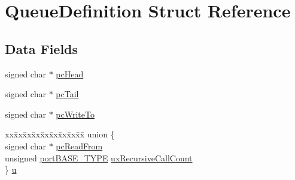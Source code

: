 \hypertarget{structQueueDefinition}{}\section{Queue\+Definition Struct Reference}
\label{structQueueDefinition}
\subsection*{Data Fields}
\begin{DoxyCompactItemize}
\item 
signed char $\ast$ \hyperlink{structQueueDefinition_ae27bcbc6d35f837dedc62321501daa49}{pc\+Head}
\item 
signed char $\ast$ \hyperlink{structQueueDefinition_a107296146c82cd122e0ba0756fb89c9d}{pc\+Tail}
\item 
signed char $\ast$ \hyperlink{structQueueDefinition_a019aa270dc6be4b3d0ea3f32e6730529}{pc\+Write\+To}
\item 
\begin{tabbing}
xx\=xx\=xx\=xx\=xx\=xx\=xx\=xx\=xx\=\kill
union \{\\
\>signed char $\ast$ \hyperlink{structQueueDefinition_a6fd0b7b0b51bb9654cdf0899bdaa4936}{pcReadFrom}\\
\>unsigned \hyperlink{portmacro_8h_a1ebe82d24d764ae4e352f7c3a9f92c01}{portBASE\_TYPE} \hyperlink{structQueueDefinition_a0582284771e9c079fa3276a31f3805ad}{uxRecursiveCallCount}\\
\} \hyperlink{structQueueDefinition_ab2c557f3e7a58a29bd07c3c62e7e568a}{u}\\


\end{tabbing}
\end{DoxyCompactItemize}
